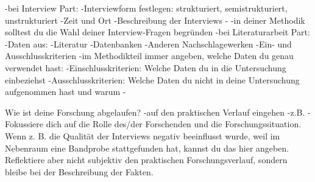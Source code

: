     -bei Interview Part:
            -Interviewform festlegen: strukturiert, semistrukturiert, unstrukturiert
            -Zeit und Ort
            -Beschreibung der Interviews
            -%
            -in deiner Methodik solltest du die Wahl deiner Interview-Fragen begründen
        -bei Literaturarbeit Part:
            -Daten aus:
                -Literatur
                -Datenbanken
                -Anderen Nachschlagewerken
        -Ein- und Ausschlusskriterien
            -im Methodikteil immer angeben, welche Daten du genau verwendet hast:
                -Einschlusskriterien: Welche Daten du in die Untersuchung einbeziehst
                -Ausschlusskriterien: Welche Daten du nicht in deine Untersuchung aufgenommen hast und warum
                    -%
    
    Wie ist deine Forschung abgelaufen?
        -auf den praktischen Verlauf eingehen
            -z.B.%
            -Fokussiere dich auf die Rolle des/der Forschenden und die Forschungssituation. Wenn z. B. die Qualität der Interviews negativ beeinflusst wurde, weil im Nebenraum eine Bandprobe stattgefunden hat, kannst du das hier angeben. Reflektiere aber nicht subjektiv den praktischen Forschungsverlauf, sondern bleibe bei der Beschreibung der Fakten.
            
